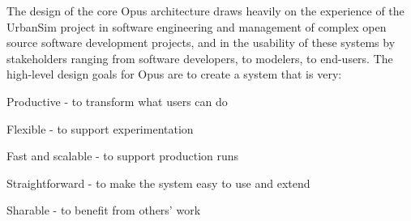 The design of the core Opus architecture draws heavily on the experience of the UrbanSim project in software engineering and management of complex open source software development projects, and in the usability of these systems by stakeholders ranging from software developers, to modelers, to end-users.   
The high-level design goals for Opus are to create a system that is very:

\squishlist
\item Productive - to transform what users can do
\item Flexible - to support experimentation
\item	Fast and scalable - to support production runs
\item	Straightforward - to make the system easy to use and extend
\item	Sharable - to benefit from others' work
\squishend

